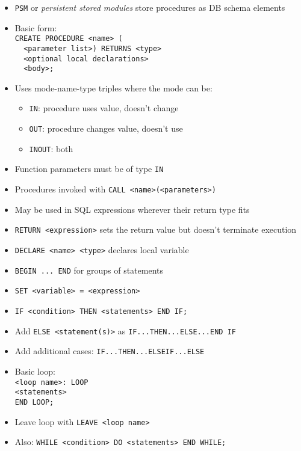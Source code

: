 \documentclass[landscape,8pt]{extarticle}
\newcommand{\code}{\lstinline}
\begin{document}
\begin{multicols}{4}
\begin{itemize}
    \begin{itemize}
        \item \code{PSM} or \emph{persistent stored modules} store procedures as DB schema elements
        \item Basic form:\\
\code{CREATE PROCEDURE <name> (}\\
\code{  <parameter list>) RETURNS <type>}\\
\code{  <optional local declarations>}\\
\code{  <body>;}
        \item Uses mode-name-type triples where the mode can be:
        \begin{itemize}
            \item \code{IN}: procedure uses value, doesn't change 
            \item \code{OUT}: procedure changes value, doesn't use
            \item \code{INOUT}: both
        \end{itemize}
        \item Function parameters must be of type \code{IN}
        \item Procedures invoked with \code{CALL <name>(<parameters>)}
        \item May be used in SQL expressions wherever their return type fits
        \item \code{RETURN <expression>} sets the return value but doesn't terminate execution
        \item \code{DECLARE <name> <type>} declares local variable
        \item \code{BEGIN ... END} for groups of statements
        \item \code{SET <variable> = <expression>}
        \item \code{IF <condition> THEN <statements> END IF;}
        \item Add \code{ELSE <statement(s)>} as \code{IF...THEN...ELSE...END IF}
        \item Add additional cases: \code{IF...THEN...ELSEIF...ELSE}
        \item Basic loop:\\
\code{<loop name>: LOOP}\\
\code{<statements>}\\
\code{END LOOP;}
        \item Leave loop with \code{LEAVE <loop name>}
        \item Also: \code{WHILE <condition> DO <statements> END WHILE;}

\end{itemize}
\end{itemize}
\end{multicols}
\end{document}
